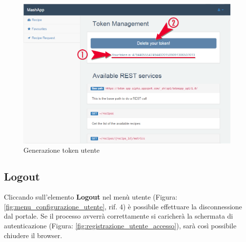 		\begin{figure}[H]
			\centering
			\centerline{\includegraphics[width=14cm]{images/token_generate.png}}
			\caption{Generazione token utente}
			\label{fig:token_generate}
		\end{figure}


	\subsection{Logout} %
	\label{sec:logout}
		Cliccando sull'elemento \textbf{Logout}\gloss{} nel menù utente (Figura: \ref{fig:menu_configurazione_utente}, rif. 4) è possibile effettuare la disconnessione dal portale.\newline
		Se il processo avverrà correttamente si caricherà la schermata di autenticazione\gloss{} (Figura: \ref{fig:registrazione_utente_accesso}), sarà così possibile chiudere il browser\gloss{}.		


